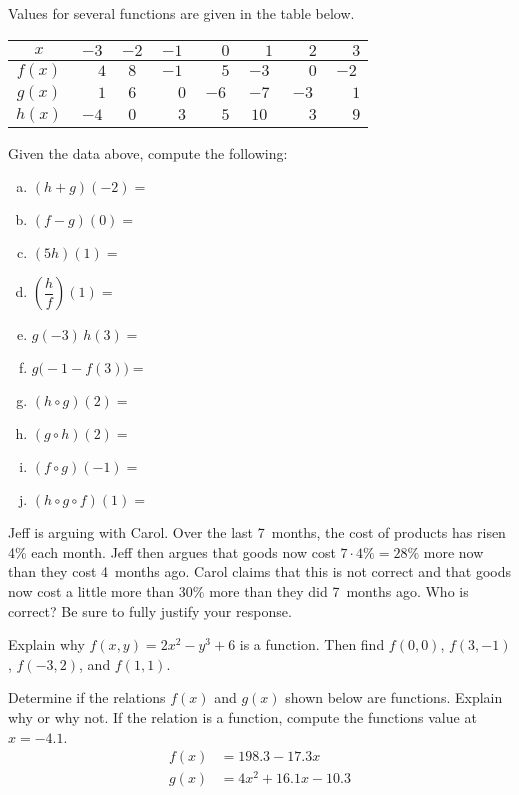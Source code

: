 \documentclass[11pt,letterpaper]{article}
\begin{document}
\prob Values for several functions are given in the table below. 
        \begin{table}[!ht]
        \centering
        \begin{tabular}{| c || c | c | c | c | c | c | c |} \hline
	$x$ & $-3$ & $-2$ & $-1$ & $\phantom{-}0$ & $\phantom{-}1$ & $\phantom{-}2$ & $\phantom{-}3$ \\ \hline \hline
	$f(x)$ & $\phantom{-}4$ & $8$ & $-1$ & $\phantom{-}5$ & $-3$ & $\phantom{-}0$ & $-2$ \\ \hline
	$g(x)$ & $\phantom{-}1$ & $6$ & $\phantom{-}0$ & $-6$ & $-7$ & $-3$ & $\phantom{-}1$ \\ \hline
	$h(x)$ & $-4$ & $0$ & $\phantom{-}3$ & $\phantom{-}5$ & $10$ & $\phantom{-}3$ & $\phantom{-}9$ \\ \hline
        \end{tabular}
        \end{table}

Given the data above, compute the following: 
        \begin{enumerate}[(a)]
        \item $(h + g)(-2)=$ 
        \item $(f - g)(0)=$ 
        \item $(5h)(1)=$ 
        \item $\left(\dfrac{h}{f}\right)(1)=$ 
        \item $g(-3)\, h(3)=$ 
        \item $g \big(-1 - f(3) \big)=$ 
        \item $(h \circ g)(2)=$ 
	\item $(g \circ h)(2)=$ 
        \item $(f \circ g)(-1)=$ 
	\item $(h \circ g \circ f)(1)=$ 
        \end{enumerate} \pspace  
  
  
\prob Jeff is arguing with Carol. Over the last 7~months, the cost of products has risen 4\% each month. Jeff then argues that goods now cost $7 \cdot 4\%= 28\%$ more now than they cost 4~months ago. Carol claims that this is not correct and that goods now cost a little more than 30\% more than they did 7~months ago. Who is correct? Be sure to fully justify your response. \pspace 
  
  
\prob Explain why $f(x, y)= 2x^2 - y^3 + 6$ is a function. Then find $f(0, 0)$, $f(3, -1)$, $f(-3, 2)$, and $f(1, 1)$. \pspace 
  

\prob Determine if the relations $f(x)$ and $g(x)$ shown below are functions. Explain why or why not. If the relation is a function, compute the functions value at $x= -4.1$. 
	\[
	\begin{aligned}
	f(x)&= 198.3 - 17.3x \\[0.3cm]
	g(x)&= 4x^2 + 16.1x - 10.3
	\end{aligned}
	\] \pspace	      
       
\end{document}
